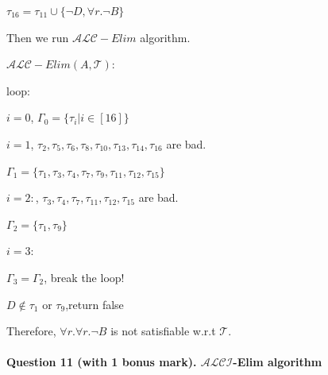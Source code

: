 \documentclass[12pt]{article}
\def \ALC {\mathcal{ALC}}
\def \T {\mathcal{T}}
\begin{document}
\begin{enumerate}
    \qquad $\tau_{16} = \tau_{11} \cup \{\neg D,\forall r.\neg B\}$ \par
        Then we run $\ALC-Elim$ algorithm. \par
        $\ALC-Elim(A,\T)$: \par
        \quad loop: 

        \qquad $i=0$, $\varGamma_0=\{\tau_i|i\in [16]\}$

        \qquad $i=1$, $\tau_2,\tau_5,\tau_6,\tau_8,\tau_{10},\tau_{13},\tau_{14},\tau_{16}$ are bad.

    \qquad $\varGamma_1=\{\tau_1,\tau_3,\tau_4,\tau_7,\tau_9,\tau_{11},\tau_{12},\tau_{15}\}$

    \qquad $i=2:$, $\tau_3,\tau_4,\tau_7,\tau_{11},\tau_{12},\tau_{15}$ are bad.

    \qquad $\varGamma_2 = \{\tau_1,\tau_9\}$

    \qquad $i=3:$

    \qquad $\varGamma_3 = \varGamma_2 $, break the loop!
    
    \quad $D \not \in \tau_1$ or $\tau_9$,\quad return false \par
    
    Therefore, $\forall r.\forall r.\neg B$ is not satisfiable w.r.t $\T$. 
    \end{enumerate}
    

    \newpage
    \paragraph{Question 11 (with 1 bonus mark). $\mathcal{ALCI}$-Elim algorithm}~{}
    \\
    
\end{document}
